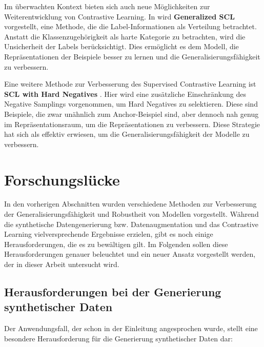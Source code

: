Im überwachten Kontext bieten sich auch neue Möglichkeiten zur Weiterentwicklung von Contrastive Learning. In \parencite{Kim2022generalizedscl} wird \textbf{Generalized SCL} vorgestellt, eine Methode, die die Label-Informationen als Verteilung betrachtet. Anstatt die Klassenzugehörigkeit als harte Kategorie zu betrachten, wird die Unsicherheit der Labels berücksichtigt. Dies ermöglicht es dem Modell, die Repräsentationen der Beispiele besser zu lernen und die Generalisierungsfähigkeit zu verbessern.

Eine weitere Methode zur Verbesserung des Supervised Contrastive Learning ist \textbf{SCL with Hard Negatives} \parencite{Jiang2022sclhardnegatives}. Hier wird eine zusätzliche Einschränkung des Negative Samplings vorgenommen, um Hard Negatives zu selektieren. Diese sind Beispiele, die zwar unähnlich zum Anchor-Beispiel sind, aber dennoch nah genug im Repräsentationsraum, um die Repräsentationen zu verbessern. Diese Strategie hat sich als effektiv erwiesen, um die Generalisierungsfähigkeit der Modelle zu verbessern.

\section{Forschungslücke} \label{sec:research-gap}

In den vorherigen Abschnitten wurden verschiedene Methoden zur Verbesserung der Generalisierungsfähigkeit und Robustheit von Modellen vorgestellt. Während die synthetische Datengenerierung bzw. Datenaugmentation und das Contrastive Learning vielversprechende Ergebnisse erzielen, gibt es noch einige Herausforderungen, die es zu bewältigen gilt. Im Folgenden sollen diese Herausforderungen genauer beleuchtet und ein neuer Ansatz vorgestellt werden, der in dieser Arbeit untersucht wird.

\subsection{Herausforderungen bei der Generierung synthetischer Daten} \label{sec:challenges-synt-data}

Der Anwendungsfall, der schon in der Einleitung angesprochen wurde, stellt eine besondere Herausforderung für die Generierung synthetischer Daten dar:

